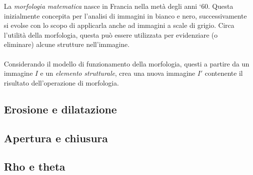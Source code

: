 \documentclass{subfiles}
\begin{document}
La \emph{morfologia matematica} nasce in Francia nella metà degli anni `60.
Questa inizialmente concepita per l'analisi di immagini in bianco e nero, successivamente si evolse con lo scopo di applicarla anche ad immagini a scale di grigio.
Circa l'utilità della morfologia, questa può essere utilizzata per evidenziare (o eliminare) alcune strutture nell'immagine.
\\ \\
Considerando il modello di funzionamento della morfologia, questi a partire da un immagine \(I\) e un \emph{elemento strutturale\footnotemark[6]},
crea una nuova immagine \(I'\) contenente il risultato dell'operazione di morfologia.

\subsection{Erosione e dilatazione}

\clearpage

\subsection{Apertura e chiusura}

\clearpage

\subsection{Rho e theta}


\end{document}
